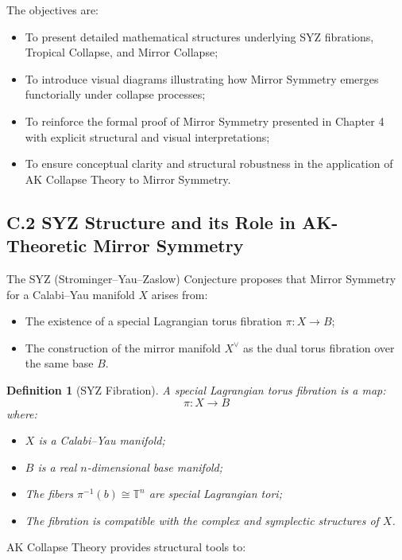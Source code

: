 \documentclass[11pt]{article}
\newtheorem{definition}[theorem]{Definition}
\begin{document}
The objectives are:

\begin{itemize}
    \item To present detailed mathematical structures underlying SYZ fibrations, Tropical Collapse, and Mirror Collapse;
    \item To introduce visual diagrams illustrating how Mirror Symmetry emerges functorially under collapse processes;
    \item To reinforce the formal proof of Mirror Symmetry presented in Chapter 4 with explicit structural and visual interpretations;
    \item To ensure conceptual clarity and structural robustness in the application of AK Collapse Theory to Mirror Symmetry.
\end{itemize}

\subsection*{C.2 SYZ Structure and its Role in AK-Theoretic Mirror Symmetry}

The SYZ (Strominger--Yau--Zaslow) Conjecture proposes that Mirror Symmetry for a Calabi--Yau manifold $X$ arises from:

\begin{itemize}
    \item The existence of a special Lagrangian torus fibration $\pi: X \to B$;
    \item The construction of the mirror manifold $X^\vee$ as the dual torus fibration over the same base $B$.
\end{itemize}

\begin{definition}[SYZ Fibration]
A special Lagrangian torus fibration is a map:
\[
\pi: X \longrightarrow B
\]
where:

\begin{itemize}
    \item $X$ is a Calabi--Yau manifold;
    \item $B$ is a real $n$-dimensional base manifold;
    \item The fibers $\pi^{-1}(b) \cong \mathbb{T}^n$ are special Lagrangian tori;
    \item The fibration is compatible with the complex and symplectic structures of $X$.
\end{itemize}
\end{definition}

AK Collapse Theory provides structural tools to:
\end{document}
